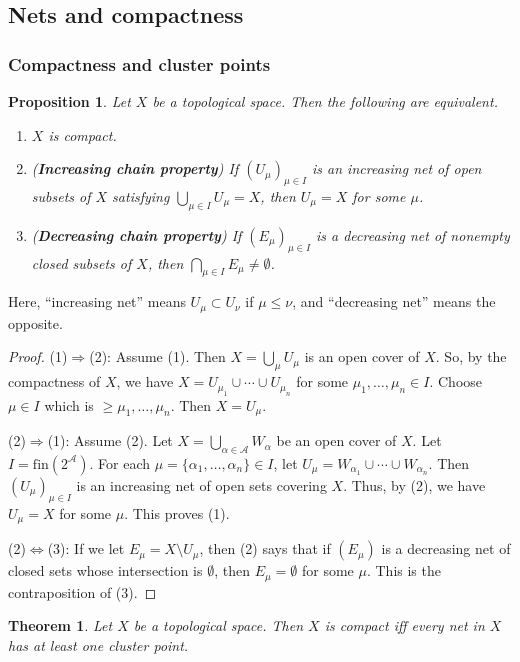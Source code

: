 \documentclass[12pt,b5paper,notitlepage]{article}
\theoremstyle{definition}
\theoremstyle{plain}
\newtheorem{thm}[df]{Theorem}
\newtheorem{pp}[df]{Proposition}
\newcommand{\scr}{\mathscr}
\newcommand{\fin}{\mathrm{fin}}
\numberwithin{equation}{section}
\begin{document}
\subsection{Nets and compactness}

\subsubsection{Compactness and cluster points}\label{lb229}


\begin{pp}\label{lb215}
Let $X$ be a topological space. Then the following are equivalent.
\begin{enumerate}[label=(\arabic*)]
\item $X$ is compact.
\item (\textbf{Increasing chain property}) If $(U_\mu)_{\mu\in I}$ is an increasing net of open subsets of $X$ satisfying $\bigcup_{\mu\in I}U_\mu=X$, then $U_\mu=X$ for some $\mu$.
\item (\textbf{Decreasing chain property}) If $(E_\mu)_{\mu\in I}$ is a decreasing net of nonempty closed subsets of $X$, then $\bigcap_{\mu\in I}E_\mu\neq\emptyset$.
\end{enumerate}
\end{pp}

Here, ``increasing net'' means $U_\mu\subset U_\nu$ if $\mu\leq \nu$, and ``decreasing net'' means the opposite.

\begin{proof}
(1)$\Rightarrow$(2): Assume (1). Then $X=\bigcup_\mu U_\mu$ is an open cover of $X$. So, by the compactness of $X$, we have $X=U_{\mu_1}\cup\cdots\cup U_{\mu_n}$ for some $\mu_1,\dots,\mu_n\in I$. Choose $\mu\in I$ which is $\geq \mu_1,\dots,\mu_n$. Then $X=U_\mu$.

(2)$\Rightarrow$(1): Assume (2). Let $X=\bigcup_{\alpha\in\scr A} W_\alpha$ be an open cover of $X$. Let $I=\fin(2^{\scr A})$. For each $\mu=\{\alpha_1,\dots,\alpha_n\}\in I$, let $U_\mu=W_{\alpha_1}\cup\cdots\cup W_{\alpha_n}$. Then $(U_\mu)_{\mu\in I}$ is an increasing net of open sets covering $X$. Thus, by (2), we have $U_\mu=X$ for some $\mu$. This proves (1).

(2)$\Leftrightarrow$(3): If we let $E_\mu=X\setminus U_\mu$, then (2) says that if $(E_\mu)$ is a decreasing net of closed sets whose intersection is $\emptyset$, then $E_\mu=\emptyset$ for some $\mu$. This is the contraposition of (3).
\end{proof}


\begin{thm}\label{lb216}
Let $X$ be a topological space. Then $X$ is compact iff every net in $X$ has at least one cluster point.
\end{thm}
\end{document}

